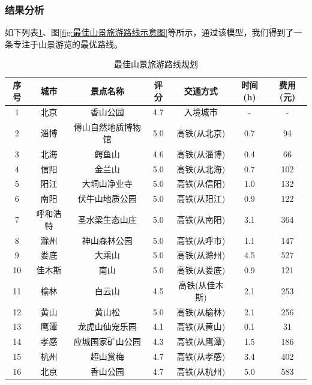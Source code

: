 \documentclass[withoutpreface,bwprint]{cumcmthesis} %
\begin{document}
\subsubsection{结果分析}
如下列表\ref{tab:最佳山景旅游路线规划}、图\ref{fig:最佳山景旅游路线示意图}等所示，通过该模型，我们得到了一条专注于山景游览的最优路线。

\begin{table}[H]
  \centering
  \caption{最佳山景旅游路线规划}
  \label{tab:最佳山景旅游路线规划}
  \small %
  \setlength{\tabcolsep}{4pt} %
  \begin{tabular}{|c|c|c|c|c|c|c|}
    \hline
    \textbf{序号} & \textbf{城市} & \textbf{景点名称} & \textbf{评分} & \textbf{交通方式} & \textbf{时间(h)} & \textbf{费用(元)} \\
    \hline
    1 & 北京 & 香山公园 & 4.7 & 入境城市 & - & - \\
    \hline
    2 & 淄博 & 傅山自然地质博物馆 & 5.0 & 高铁(从北京) & 0.7 & 94 \\
    \hline
    3 & 北海 & 鳄鱼山 & 4.6 & 高铁(从淄博) & 0.4 & 66 \\
    \hline
    4 & 信阳 & 金兰山 & 5.0 & 高铁(从北海) & 0.7 & 102 \\
    \hline
    5 & 阳江 & 大垌山净业寺 & 5.0 & 高铁(从信阳) & 1.0 & 132 \\
    \hline
    6 & 南阳 & 伏牛山地质公园 & 5.0 & 高铁(从阳江) & 0.9 & 122 \\
    \hline
    7 & 呼和浩特 & 圣水梁生态山庄 & 5.0 & 高铁(从南阳) & 3.1 & 364 \\
    \hline
    8 & 滁州 & 神山森林公园 & 5.0 & 高铁(从呼市) & 1.1 & 147 \\
    \hline
    9 & 娄底 & 大乘山 & 5.0 & 高铁(从滁州) & 4.5 & 527 \\
    \hline
    10 & 佳木斯 & 南山 & 5.0 & 高铁(从娄底) & 0.9 & 121 \\
    \hline
    11 & 榆林 & 白云山 & 4.5 & 高铁(从佳木斯) & 2.1 & 253 \\
    \hline
    12 & 黄山 & 黄山松 & 5.0 & 高铁(从榆林) & 2.1 & 256 \\
    \hline
    13 & 鹰潭 & 龙虎山仙宠乐园 & 4.1 & 高铁(从黄山) & 0.1 & 31 \\
    \hline
    14 & 孝感 & 应城国家矿山公园 & 4.3 & 高铁(从鹰潭) & 1.5 & 186 \\
    \hline
    15 & 杭州 & 超山赏梅 & 4.7 & 高铁(从孝感) & 3.4 & 402 \\
    \hline
    16 & 北京 & 香山公园 & 4.7 & 高铁(从杭州) & 5.0 & 583 \\
    \hline
  \end{tabular}
\end{table}
\end{document}
